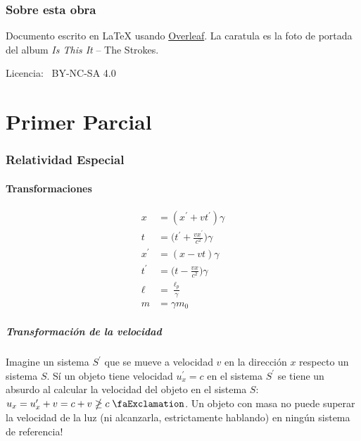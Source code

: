 \documentclass[10pt,twocolumn,titlepage]{article}
\newcommand{\ojo}{\text{\faExclamation}}
\begin{document}
 \section*{Sobre esta obra}

 Documento escrito en \textrm{\LaTeX} usando \href{https://www.overleaf.com}{Overleaf}. La caratula es la foto de portada del album \emph{Is This It} -- The Strokes.\par
 
 \vspace{1cm}
 \begingroup

\selectfont
\noindent
 Licencia: \faCreativeCommons~BY-NC-SA 4.0
 \endgroup
 


\clearpage
\onecolumn
\tableofcontents  
\clearpage
\twocolumn

 
 \part{Primer Parcial}
 
\section{Relatividad Especial}
\subsection{Transformaciones}
\begin{align*}
x&=(x^\prime +vt^\prime)\gamma \\
t &= \bigg( t^\prime +\frac{vx^\prime}{c^2}\bigg) \gamma \\
x^\prime &= ( x-vt)\gamma \\
t^\prime &= \bigg(  t-\frac{vx}{c^2}  \bigg)\gamma \\
\ell &= \frac{\ell_p}{\gamma} \\
m &= \gamma m_0 
\end{align*}
\subsubsection*{Transformación de la velocidad}
Imagine un sistema $S^\prime$ que se mueve a velocidad $v$ en la dirección $x$ respecto un sistema $S$. Sí un objeto tiene velocidad $u^\prime_x=c$ en el sistema $S^\prime$ se tiene un absurdo al calcular la velocidad del objeto en el sistema $S$: $u_x=u^\prime_x+v=c+v\ngeq c\; \ojo$. Un objeto con masa no puede superar la velocidad de la luz (ni alcanzarla, estrictamente hablando) en ningún sistema de referencia!
\end{document}
